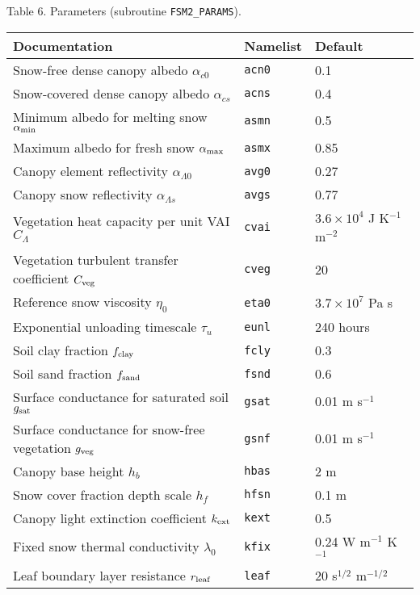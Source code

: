 \documentclass[fleqn]{article}
\begin{document}
{Table 6. Parameters (subroutine {\tt FSM2\_PARAMS}).
\begin{longtable}{|l|l|l|}
\hline
Documentation                                      & Namelist   & Default          \\
\hline
Snow-free dense canopy albedo $\alpha_{c0}$        & {\tt acn0} & 0.1              \\
Snow-covered dense canopy albedo $\alpha_{cs}$     & {\tt acns} & 0.4              \\ 
Minimum albedo for melting snow $\alpha_{\rm min}$ & {\tt asmn} & 0.5              \\
Maximum albedo for fresh snow $\alpha_{\rm max}$   & {\tt asmx} & 0.85             \\
Canopy element reflectivity $\alpha_{\Lambda 0}$   & {\tt avg0} & 0.27             \\
Canopy snow reflectivity $\alpha_{\Lambda s}$      & {\tt avgs} & 0.77             \\ 
Vegetation heat capacity per unit VAI $C_\Lambda$  & {\tt cvai} & $3.6 \times 10^4$ J K$^{-1}$ m$^{-2}$ \\
Vegetation turbulent transfer coefficient $C_{\rm veg}$ & {\tt cveg} & 20          \\
Reference snow viscosity $\eta_0$                  & {\tt eta0} & $3.7 \times 10^7$ Pa s \\
Exponential unloading timescale $\tau_u$           & {\tt eunl} & 240 hours        \\
Soil clay fraction $f_{\rm clay}$                  & {\tt fcly} & 0.3              \\
Soil sand fraction $f_{\rm sand}$                  & {\tt fsnd} & 0.6              \\
Surface conductance for saturated soil $g_{\rm sat}$ & {\tt gsat} & 0.01 m s$^{-1}$\\
Surface conductance for snow-free vegetation $g_{\rm veg}$ & {\tt gsnf} & 0.01 m s$^{-1}$   \\
Canopy base height $h_b$                           & {\tt hbas} & 2 m              \\
Snow cover fraction depth scale $h_f$              & {\tt hfsn} & 0.1 m            \\
Canopy light extinction coefficient $k_{\rm ext}$  & {\tt kext} &  0.5             \\
Fixed snow thermal conductivity $\lambda_0$        & {\tt kfix} & 0.24 W m$^{-1}$ K$^{-1}$  \\
Leaf boundary layer resistance $r_{\rm leaf}$      & {\tt leaf} & 20 s$^{1/2}$ m$^{-1/2}$   \\ 

\end{longtable}}
\end{document}
